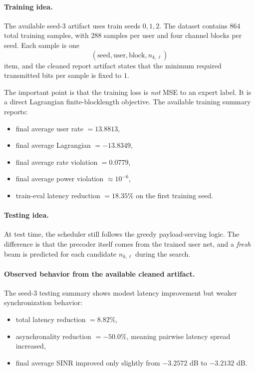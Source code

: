 \documentclass[11pt]{article}
\begin{document}
\paragraph{Training idea.}
The available seed-3 artifact uses train seeds \(0,1,2\). The dataset contains \(864\) total training samples, with \(288\) samples per user and four channel blocks per seed. Each sample is one
\[
(\text{seed}, \text{user}, \text{block}, n_{k,\ell})
\]
item, and the cleaned report artifact states that the minimum required transmitted bits per sample is fixed to \(1\).

The important point is that the training loss is \emph{not} MSE to an expert label. It is a direct Lagrangian finite-blocklength objective. The available training summary reports:
\begin{itemize}[leftmargin=1.5em]
    \item final average user rate \(= 13.8813\),
    \item final average Lagrangian \(= -13.8349\),
    \item final average rate violation \(= 0.0779\),
    \item final average power violation \(\approx 10^{-6}\),
    \item train-eval latency reduction \(= 18.35\%\) on the first training seed.
\end{itemize}

\paragraph{Testing idea.}
At test time, the scheduler still follows the greedy payload-serving logic. The difference is that the precoder itself comes from the trained user net, and a \emph{fresh} beam is predicted for each candidate \(n_{k,\ell}\) during the search.

\paragraph{Observed behavior from the available cleaned artifact.}
The seed-3 testing summary shows modest latency improvement but weaker synchronization behavior:
\begin{itemize}[leftmargin=1.5em]
    \item total latency reduction \(= 8.82\%\),
    \item asynchronality reduction \(= -50.0\%\), meaning pairwise latency spread increased,
    \item final average SINR improved only slightly from \(-3.2572\) dB to \(-3.2132\) dB.
\end{itemize}
\end{document}

